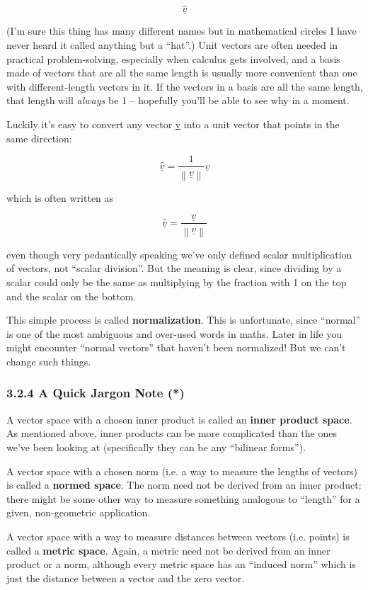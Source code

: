 \documentclass[oneside,english]{amsbook}
\numberwithin{section}{chapter}
\theoremstyle{plain}
\theoremstyle{definition}
\begin{document}
\[\underline{\widehat{v}}\]

(I'm sure this thing has many different names but in mathematical
circles I have never heard it called anything but a ``hat''.) Unit
vectors are often needed in practical problem-solving, especially when
calculus gets involved, and a basis made of vectors that are all the
same length is usually more convenient than one with different-length
vectors in it. If the vectors in a basis are all the same length, that
length will \emph{always} be 1 -- hopefully you'll be able to see why in
a moment.

Luckily it's easy to convert any vector \ul{v} into a unit vector that
points in the same direction:

\[\underline{\widehat{v}} = \frac{1}{\left\| \underline{v} \right\|}\underline{v}\]

which is often written as

\[\underline{\widehat{v}} = \frac{\underline{v}}{\left\| \underline{v} \right\|}\]

even though very pedantically speaking we've only defined scalar
multiplication of vectors, not ``scalar division''. But the meaning is
clear, since dividing by a scalar could only be the same as multiplying
by the fraction with 1 on the top and the scalar on the bottom.

This simple process is called \textbf{normalization}. This is
unfortunate, since ``normal'' is one of the most ambiguous and over-used
words in maths. Later in life you might encounter ``normal vectors''
that haven't been normalized! But we can't change such things.

\subsubsection{3.2.4 A Quick Jargon Note (*)}\label{a-quick-jargon-note}

A vector space with a chosen inner product is called an \textbf{inner
	product space}. As mentioned above, inner products can be more
complicated than the ones we've been looking at (specifically they can
be any ``bilinear forms'').

A vector space with a chosen norm (i.e. a way to measure the lengths of
vectors) is called a \textbf{normed space}. The norm need not be derived
from an inner product: there might be some other way to measure
something analogous to ``length'' for a given, non-geometric
application.

A vector space with a way to measure distances between vectors (i.e.
points) is called a \textbf{metric space}. Again, a metric need not be
derived from an inner product or a norm, although every metric space has
an ``induced norm'' which is just the distance between a vector and the
zero vector.
\end{document}
